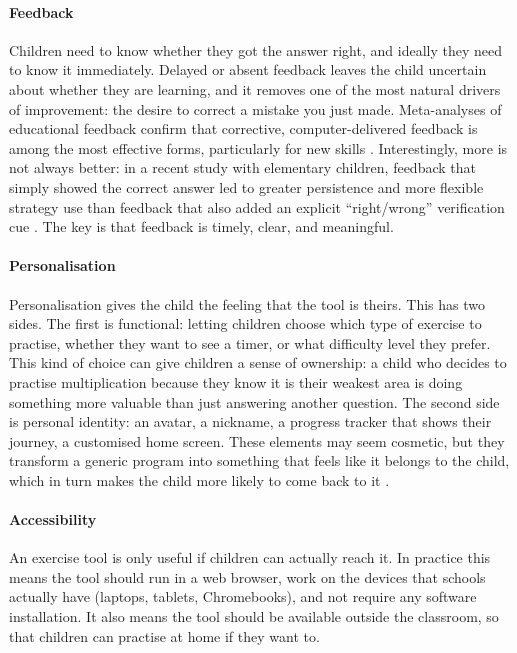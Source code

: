 \paragraph{Feedback}
Children need to know whether they got the answer right, and ideally they need to know it immediately. Delayed or absent feedback leaves the child uncertain about whether they are learning, and it removes one of the most natural drivers of improvement: the desire to correct a mistake you just made. Meta-analyses of educational feedback confirm that corrective, computer-delivered feedback is among the most effective forms, particularly for new skills \cite{wisniewski2020power}. Interestingly, more is not always better: in a recent study with elementary children, feedback that simply showed the correct answer led to greater persistence and more flexible strategy use than feedback that also added an explicit ``right/wrong'' verification cue \cite{merrick2024feedback}. The key is that feedback is timely, clear, and meaningful.

\paragraph{Personalisation}
Personalisation gives the child the feeling that the tool is theirs. This has two sides. The first is functional: letting children choose which type of exercise to practise, whether they want to see a timer, or what difficulty level they prefer. This kind of choice can give children a sense of ownership: a child who decides to practise multiplication because they know it is their weakest area is doing something more valuable than just answering another question. The second side is personal identity: an avatar, a nickname, a progress tracker that shows their journey, a customised home screen. These elements may seem cosmetic, but they transform a generic program into something that feels like it belongs to the child, which in turn makes the child more likely to come back to it \cite{cordova1996intrinsic}.

\paragraph{Accessibility}
An exercise tool is only useful if children can actually reach it. In practice this means the tool should run in a web browser, work on the devices that schools actually have (laptops, tablets, Chromebooks), and not require any software installation. It also means the tool should be available outside the classroom, so that children can practise at home if they want to. 

